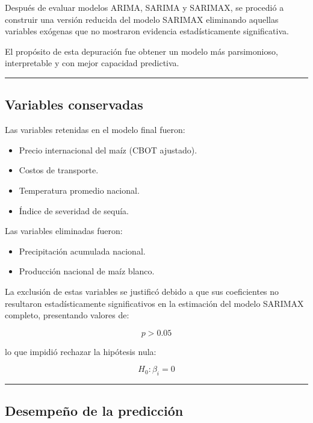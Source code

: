 \documentclass[11pt]{article}
\providecommand{\tightlist}{%
      \setlength{\itemsep}{0pt}\setlength{\parskip}{0pt}}
\begin{document}
Después de evaluar modelos ARIMA, SARIMA y SARIMAX, se procedió a
construir una versión reducida del modelo SARIMAX eliminando aquellas
variables exógenas que no mostraron evidencia estadísticamente
significativa.

El propósito de esta depuración fue obtener un modelo más parsimonioso,
interpretable y con mejor capacidad predictiva.

\begin{center}\rule{0.5\linewidth}{0.5pt}\end{center}

\hypertarget{variables-conservadas}{%
\subsection{Variables conservadas}\label{variables-conservadas}}

Las variables retenidas en el modelo final fueron:

\begin{itemize}
\tightlist
\item
  Precio internacional del maíz (CBOT ajustado).
\item
  Costos de transporte.
\item
  Temperatura promedio nacional.
\item
  Índice de severidad de sequía.
\end{itemize}

Las variables eliminadas fueron:

\begin{itemize}
\tightlist
\item
  Precipitación acumulada nacional.
\item
  Producción nacional de maíz blanco.
\end{itemize}

La exclusión de estas variables se justificó debido a que sus
coeficientes no resultaron estadísticamente significativos en la
estimación del modelo SARIMAX completo, presentando valores de:

\[
p > 0.05
\]

lo que impidió rechazar la hipótesis nula:

\[
H_0:\beta_i = 0
\]

\begin{center}\rule{0.5\linewidth}{0.5pt}\end{center}

\hypertarget{desempeuxf1o-de-la-predicciuxf3n}{%
\subsection{Desempeño de la
predicción}\label{desempeuxf1o-de-la-predicciuxf3n}}
\end{document}

